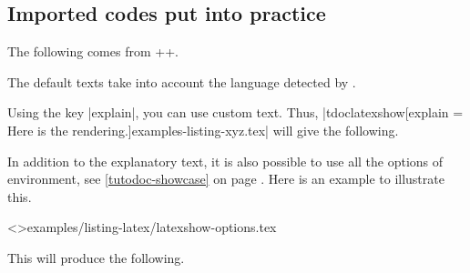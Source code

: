 \documentclass{tutodoc}
\begin{document}


\subsection{Imported codes put into practice}
\label{tutodoc-listing-latexshow}

\begin{tdocexa}[Showcase]
    The following comes from \tdoclatexin++.

    \medskip

    \begin{tdocshowcaseDOC}
    \end{tdocshowcaseDOC}
\end{tdocexa}


\begin{tdocnote}
    The default texts take into account the language detected by \thisproj.
\end{tdocnote}




\begin{tdocexa}
    Using the key \tdoclatexin|explain|, you can use custom text. Thus, \tdoclatexin|tdoclatexshow[explain = Here is the rendering.]{examples-listing-xyz.tex}| will give the following.

    \medskip

    \begin{tdocshowcaseDOC}
    \end{tdocshowcaseDOC}
\end{tdocexa}




\begin{tdocexa}
    In addition to the explanatory text, it is also possible to use all the options of  environment, see \ref{tutodoc-showcase} on page \pageref{tutodoc-showcase}.
    Here is an example to illustrate this.

    \medskip

    \tdoclatexinput<>{examples/listing-latex/latexshow-options.tex}

    \medskip

    This will produce the following.

    \medskip

    \begin{tdocshowcaseDOC}
        
    \end{tdocshowcaseDOC}
\end{tdocexa}
\end{document}
